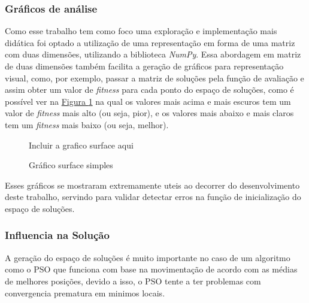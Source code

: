         \subsubsection{Gráficos de análise}
            Como esse trabalho tem como foco uma exploração e implementação mais didática foi optado a utilização de uma representação em forma de uma matriz com duas dimensões, utilizando a biblioteca \textit{NumPy}. Essa abordagem em matriz de duas dimensões também facilita a geração de gráficos para representação visual, como, por exemplo, passar a matriz de soluções pela função de avaliação e assim obter um valor de \textit{fitness} para cada ponto do espaço de soluções, como é possível ver na 
            \hyperref[fig:surfaceplot]{Figura \ref{fig:surfaceplot}} 
            na qual os valores mais acima e mais escuros tem um valor de \textit{fitness} mais alto (ou seja, pior), e os valores mais abaixo e mais claros tem um \textit{fitness} mais baixo (ou seja, melhor).\newline

            \begin{figure}[h]
                \centering
                \small{Incluir a grafico surface aqui}
                \caption{Gráfico surface simples}
                \label{fig:surfaceplot}
            \end{figure}

            Esses gráficos se mostraram extremamente uteis ao decorrer do desenvolvimento deste trabalho, servindo para validar detectar erros na função de inicialização do espaço de soluções.\newline


        \subsubsection{Influencia na Solução}
            A geração do espaço de soluções é muito importante no caso de um algoritmo como o PSO 
            que funciona com base na movimentação de acordo com as médias de melhores posições, 
            devido a isso, o PSO tente a ter problemas com convergencia prematura em minimos locais.\newline
            

